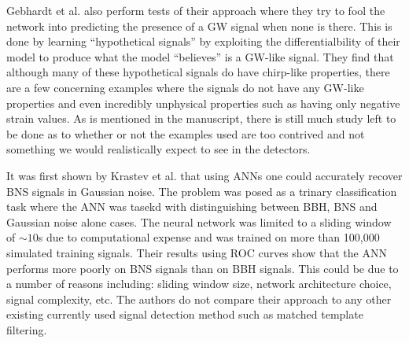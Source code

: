 %
%
Gebhardt et al. also perform tests of their approach where they try to fool the network into predicting the presence of a \ac{GW} signal when none is there. This is done by learning ``hypothetical signals'' by exploiting the differentialbility of their model to produce what the model ``believes'' is a \ac{GW}-like signal. They find that although many of these hypothetical signals do have chirp-like properties, there are a few concerning examples where the signals do not have any \ac{GW}-like properties and even incredibly unphysical properties such as having only negative strain values. As is mentioned in the manuscript, there is still much study left to be done as to whether or not the examples used are too contrived and not something we would realistically expect to see in the detectors\cite{1904.08693}.

%

It was first shown by Krastev et al. that using \ac{ANN}s one could accurately recover \ac{BNS} signals in Gaussian noise. The problem was posed as a trinary classification task where the \ac{ANN} was tasekd with distinguishing between \ac{BBH}, \ac{BNS} and Gaussian noise alone cases. The neural network was limited to a sliding window of $\sim10$s due to computational expense and was trained on more than 100,000 simulated training signals. Their results using ROC curves show that the \ac{ANN} performs more poorly on \ac{BNS} signals than on \ac{BBH} signals. This could be due to a number of reasons including: sliding window size, network architecture choice, signal complexity, etc. The authors do not compare their approach to any other existing currently used signal detection method such as matched template filtering\cite{KRASTEV2020135330}.

%


